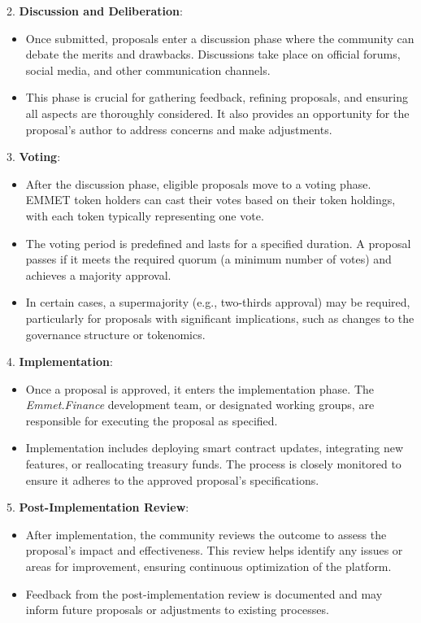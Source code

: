 \documentclass[12pt, a4paper]{article}
\begin{document}
2. \textbf{Discussion and Deliberation}:
   \begin{itemize}
       \item Once submitted, proposals enter a discussion phase where the community can debate the merits and drawbacks. Discussions take place on official forums, social media, and other communication channels.
       \item This phase is crucial for gathering feedback, refining proposals, and ensuring all aspects are thoroughly considered. It also provides an opportunity for the proposal's author to address concerns and make adjustments.
   \end{itemize}

3. \textbf{Voting}:
   \begin{itemize}
       \item After the discussion phase, eligible proposals move to a voting phase. EMMET token holders can cast their votes based on their token holdings, with each token typically representing one vote.
       \item The voting period is predefined and lasts for a specified duration. A proposal passes if it meets the required quorum (a minimum number of votes) and achieves a majority approval.
       \item In certain cases, a supermajority (e.g., two-thirds approval) may be required, particularly for proposals with significant implications, such as changes to the governance structure or tokenomics.
   \end{itemize}

4. \textbf{Implementation}:
   \begin{itemize}
       \item Once a proposal is approved, it enters the implementation phase. The \textit{Emmet.Finance} development team, or designated working groups, are responsible for executing the proposal as specified.
       \item Implementation includes deploying smart contract updates, integrating new features, or reallocating treasury funds. The process is closely monitored to ensure it adheres to the approved proposal's specifications.
   \end{itemize}

5. \textbf{Post-Implementation Review}:
   \begin{itemize}
       \item After implementation, the community reviews the outcome to assess the proposal's impact and effectiveness. This review helps identify any issues or areas for improvement, ensuring continuous optimization of the platform.
       \item Feedback from the post-implementation review is documented and may inform future proposals or adjustments to existing processes.
   \end{itemize}
\end{document}
